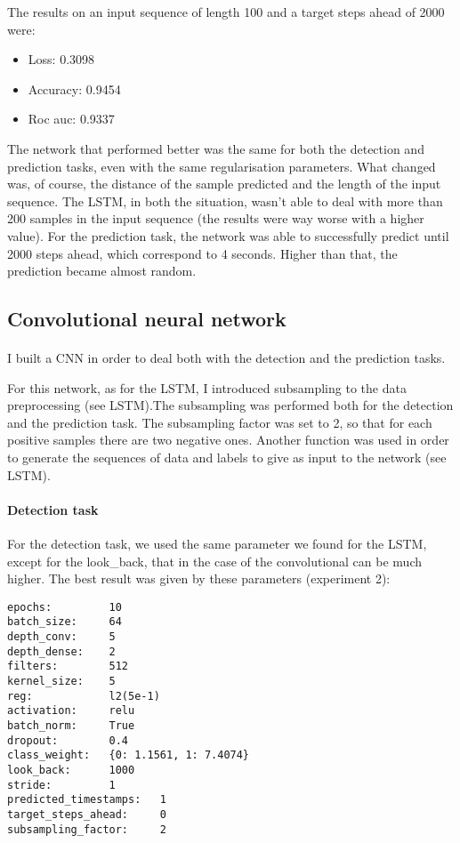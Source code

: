 The results on an input sequence of length 100 and a target steps ahead of 2000 were:

\begin{itemize}
    \item Loss: 0.3098
    \item Accuracy: 0.9454
    \item Roc auc: 0.9337
\end{itemize}

The network that performed better was the same for both the detection and prediction tasks, even with the same regularisation parameters. What changed was, of course, the distance of the sample predicted and the length of the input sequence. The LSTM, in both the situation, wasn't able to deal with more than 200 samples in the input sequence (the results were way worse with a higher value). For the prediction task, the network was able to successfully predict until 2000 steps ahead, which correspond to 4 seconds. Higher than that, the prediction became almost random.


\subsection{Convolutional neural network}

\paragraph{} I built a CNN in order to deal both with the detection and the prediction tasks.

For this network, as for the LSTM, I introduced subsampling to the data preprocessing (see LSTM).The subsampling was performed both for the detection and the prediction task. The subsampling factor was set to 2, so that for each positive samples there are two negative ones. Another function was used in order to generate the sequences of data and labels to give as input to the network (see LSTM).

\paragraph{Detection task} For the detection task, we used the same parameter we found for the LSTM, except for the look\_back, that in the case of the convolutional can be much higher. The best result was given by these parameters (experiment 2):
\begin{lstlisting}
epochs:			10
batch_size:		64
depth_conv:		5
depth_dense:	2
filters:        512
kernel_size:	5
reg:            l2(5e-1)
activation:		relu
batch_norm:		True
dropout:        0.4
class_weight:	{0: 1.1561, 1: 7.4074}
look_back:		1000
stride:			1
predicted_timestamps:	1
target_steps_ahead:		0
subsampling_factor:		2
\end{lstlisting}

